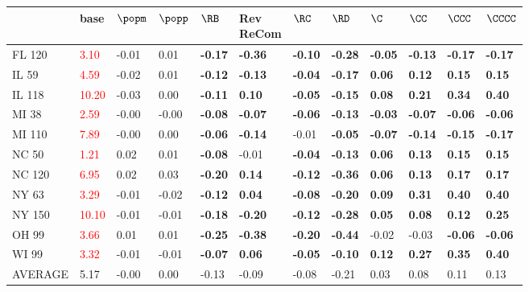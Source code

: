 \begin{tabular}{llllllllllll}
\toprule
 & base & $\popm$ & $\popp$ & $\RB$ & \makecell{Rev \\ ReCom} & $\RC$ & $\RD$ & $\C$ & $\CC$ & $\CCC$ & $\CCCC$ \\
\midrule
FL 120 & \textcolor{red}{ 3.10 } & -0.01 & 0.01 & \textbf{-0.17} & \textbf{-0.36} & \textbf{-0.10} & \textbf{-0.28} & \textbf{-0.05} & \textbf{-0.13} & \textbf{-0.17} & \textbf{-0.17} \\
IL 59 & \textcolor{red}{ 4.59 } & -0.02 & 0.01 & \textbf{-0.12} & \textbf{-0.13} & \textbf{-0.04} & \textbf{-0.17} & \textbf{0.06} & \textbf{0.12} & \textbf{0.15} & \textbf{0.15} \\
IL 118 & \textcolor{red}{ 10.20 } & -0.03 & 0.00 & \textbf{-0.11} & \textbf{0.10} & \textbf{-0.05} & \textbf{-0.15} & \textbf{0.08} & \textbf{0.21} & \textbf{0.34} & \textbf{0.40} \\
MI 38 & \textcolor{red}{ 2.59 } & -0.00 & -0.00 & \textbf{-0.08} & \textbf{-0.07} & \textbf{-0.06} & \textbf{-0.13} & \textbf{-0.03} & \textbf{-0.07} & \textbf{-0.06} & \textbf{-0.06} \\
MI 110 & \textcolor{red}{ 7.89 } & -0.00 & 0.00 & \textbf{-0.06} & \textbf{-0.14} & -0.01 & \textbf{-0.05} & \textbf{-0.07} & \textbf{-0.14} & \textbf{-0.15} & \textbf{-0.17} \\
NC 50 & \textcolor{red}{ 1.21 } & 0.02 & 0.01 & \textbf{-0.08} & -0.01 & \textbf{-0.04} & \textbf{-0.13} & \textbf{0.06} & \textbf{0.13} & \textbf{0.15} & \textbf{0.15} \\
NC 120 & \textcolor{red}{ 6.95 } & 0.02 & 0.03 & \textbf{-0.20} & \textbf{0.14} & \textbf{-0.12} & \textbf{-0.36} & \textbf{0.06} & \textbf{0.13} & \textbf{0.17} & \textbf{0.17} \\
NY 63 & \textcolor{red}{ 3.29 } & -0.01 & -0.02 & \textbf{-0.12} & \textbf{0.04} & \textbf{-0.08} & \textbf{-0.20} & \textbf{0.09} & \textbf{0.31} & \textbf{0.40} & \textbf{0.40} \\
NY 150 & \textcolor{red}{ 10.10 } & -0.01 & -0.01 & \textbf{-0.18} & \textbf{-0.20} & \textbf{-0.12} & \textbf{-0.28} & \textbf{0.05} & \textbf{0.08} & \textbf{0.12} & \textbf{0.25} \\
OH 99 & \textcolor{red}{ 3.66 } & 0.01 & 0.01 & \textbf{-0.25} & \textbf{-0.38} & \textbf{-0.20} & \textbf{-0.44} & -0.02 & -0.03 & \textbf{-0.06} & \textbf{-0.06} \\
WI 99 & \textcolor{red}{ 3.32 } & -0.01 & -0.01 & \textbf{-0.07} & \textbf{0.06} & \textbf{-0.05} & \textbf{-0.10} & \textbf{0.12} & \textbf{0.27} & \textbf{0.35} & \textbf{0.40} \\
AVERAGE & 5.17 & -0.00 & 0.00 & -0.13 & -0.09 & -0.08 & -0.21 & 0.03 & 0.08 & 0.11 & 0.13 \\
\bottomrule
\end{tabular}
